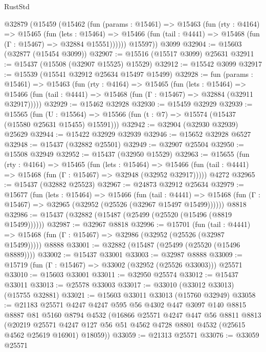 \begin{lexlean}{RustStd}
\begin{coremodule}
    @32879
      (@15459
        (@15462
          (fun (params : @15461) =>
          @15463
            (fun (rty : @4164) =>
            @15465
              (fun (lets : @15464) =>
              @15466 (fun (tail : @4441) => @15468 (fun (Γ : @15467) => @32884 @15551))))))
        @15597))
    @3099
@32904 := @15603 (@32877 (@15454 @3099))
@32907 := @15516 (@15517 @3099) @25631
@32911 := @15437 (@15508 (@32907 @15525) @15529)
@32912 := @15542 @3099
@32917 := @15539 (@15541 @32912 @25634 @15497 @15499)
@32928 := fun (params : @15461) =>
  @15463
    (fun (rty : @4164) =>
    @15465
      (fun (lets : @15464) =>
      @15466 (fun (tail : @4441) => @15468 (fun (Γ : @15467) => @32884 (@32911 @32917)))))
@32929 := @15462 @32928
@32930 := @15459 @32929
@32939 := @15565
    (fun (U : @15564) => @15566 (fun (t : @7) => @15574 (@15437 (@15580 @25631 @15455) @15591)))
@32942 := @32904 (@32930 @32939) @25629
@32944 := @15422 @32929 @32939
@32946 := @15652 @32928 @6527
@32948 := @15437 (@32882 @25501)
@32949 := @32907 @25504
@32950 := @15508 @32949
@32952 := @15437 (@32950 @15529)
@32963 := @15655
    (fun (rty : @4164) =>
    @15465
      (fun (lets : @15464) =>
      @15466 (fun (tail : @4441) => @15468 (fun (Γ : @15467) => @32948 (@32952 @32917)))))
    @4272
@32965 := @15437 (@32882 @25523)
@32967 := @24873 @32912 @25634
@32979 := @15677
    (fun (lets : @15464) =>
    @15466
      (fun (tail : @4441) =>
      @15468 (fun (Γ : @15467) => @32965 (@32952 (@25526 (@32967 @15497 @15499))))))
    @8818
@32986 := @15437 (@32882 (@15487 (@25499 (@25520 (@15496 (@8819 @15499))))))
@32987 := @32967 @8818
@32996 := @15701
    (fun (tail : @4441) => @15468 (fun (Γ : @15467) => @32986 (@32952 (@25526 (@32987 @15499)))))
    @8888
@33001 := @32882 (@15487 (@25499 (@25520 (@15496 @8889))))
@33002 := @15437 @33001
@33003 := @32987 @8888
@33009 := @15719 (fun (Γ : @15467) => @33002 (@32952 (@25526 @33003))) @25571
@33010 := @15603 @33001
@33011 := @32950 @25574
@33012 := @15437 @33011
@33013 := @25578 @33003
@33017 := @33010 (@33012 @33013) (@15755 @32881)
@33021 := @15603 @33011 @33013 (@15760 @32949)
@33058 := @21183
    @25571
    @4247
    @4247
    @595
    @56
    @4302
    @447
    @3097
    @140
    @8815
    @8887
    @81
    @5160
    @8794
    @4532
    (@16866
      @25571
      @4247
      @447
      @56
      @8811
      @8813
      (@20219
        @25571
        @4247
        @127
        @56
        @51
        @4562
        @4728
        @8801
        @4532
        (@25615 @4562 @25619 @16901)
        @18059))
@33059 := @21313 @25571
@33076 := @33059
    @25571

\end{coremodule}
\end{lexlean}
